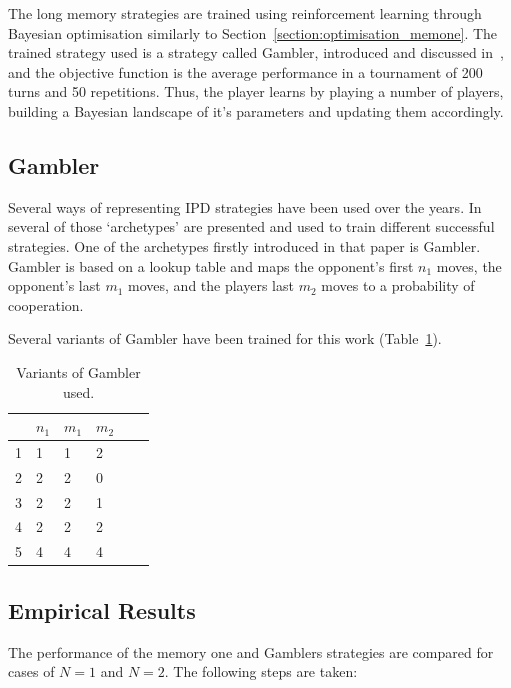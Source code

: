 \documentclass[10pt]{article}
\begin{document}
The long memory strategies are trained using reinforcement learning through
Bayesian optimisation similarly to Section~\ref{section:optimisation_memone}.
The trained strategy used is a strategy called Gambler,
introduced and discussed in~\cite{Harper2017}, and the objective function
is the average performance in a tournament of 200 turns and 50 repetitions.
Thus, the player learns by playing a number of players, building a Bayesian
landscape of it's parameters and updating them accordingly.

\subsection{Gambler}

Several ways of representing IPD strategies have been used over the years.
In~\cite{Harper2017} several of those `archetypes' are presented
and used to train different successful strategies. One of the archetypes firstly
introduced in that paper is Gambler. Gambler is based on a lookup table and maps
the opponent's first \(n_1\) moves, the opponent's
last \(m_1\) moves, and the players last \(m_2\) moves to a probability of
cooperation.

Several variants of Gambler have been trained for this work
(Table~\ref{table:gambler}).

\begin{table}[htbp]
    \begin{center}
    \begin{tabular}{clllll}
        \toprule
        {}&  \(n_1\) & \(m_1\) & \(m_2\)\\
        \midrule
        1 & 1 & 1 & 2\\
        2 & 2 & 2 & 0\\
        3 & 2 & 2 & 1\\
        4 & 2 & 2 & 2\\
        5 & 4 & 4 & 4\\
        \bottomrule
    \end{tabular}
    \end{center}
    \caption{Variants of Gambler used.}
    \label{table:gambler}
\end{table}

\subsection{Empirical Results}

The performance of the memory one and Gamblers strategies are compared for cases of
\(N=1\) and \(N=2\). The following steps are taken:
\end{document}
